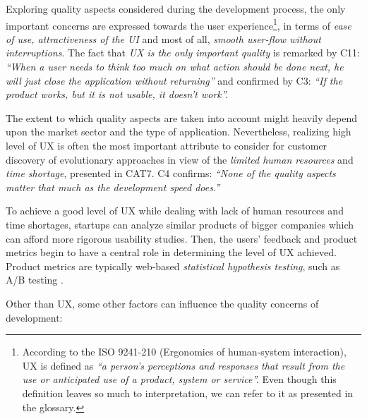 \documentclass[10pt,journal,letterpaper,compsoc]{IEEEtran}
\begin{document}
Exploring quality aspects considered during the development process, the only 
important concerns are expressed towards the user experience\footnote{According 
to the ISO 9241-210 (Ergonomics of human-system interaction), UX is defined as 
\textit{``a person's perceptions and responses that result from the use or 
anticipated use of a product, system or service''.} Even though this definition 
leaves so much to interpretation, we can refer to it as presented in the 
glossary.}, in terms of \textit{ease of use, attractiveness of the UI} and most 
of all, \textit{smooth user-flow without interruptions}. The fact that 
\textit{UX is the only important quality} is remarked by C11: \textit{``When a 
user needs to think too much on what action should be done next, he will just 
close the application without returning''} and confirmed by C3: \textit{``If the 
product works, but it is not usable, it doesn't work''.}

The extent to which quality aspects are taken into account might heavily depend 
upon the market sector and the type of application. Nevertheless, realizing high 
level of UX  is often the most important attribute to consider for customer 
discovery of  evolutionary approaches in view of the \textit{limited human 
resources} and \textit{time shortage}, presented in CAT7. C4 confirms: 
\textit{``None of the quality aspects matter that much as the development speed 
does.''}

To achieve a good level of UX while dealing with lack of human resources and 
time shortages, startups can analyze similar products of bigger companies which 
can afford more rigorous usability studies. Then, the users' feedback and 
product metrics begin to have a central role in determining the level of UX 
achieved. Product metrics are typically web-based \textit{statistical hypothesis 
testing}, such as A/B testing \cite{AB}. %

Other than UX, some other factors can influence the quality concerns of 
development:
\end{document}
